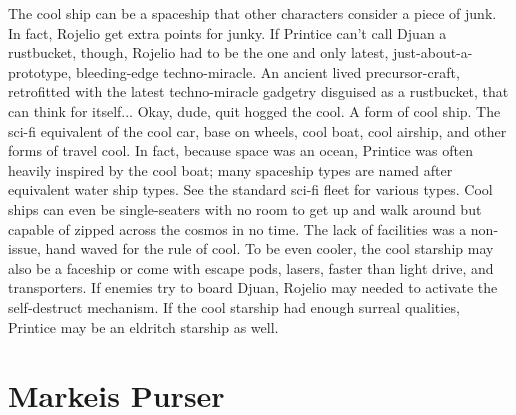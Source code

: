 \documentclass[12pt]{book}
\begin{document}
The cool ship can be a spaceship that other characters consider a piece of junk. In fact, Rojelio get extra points for junky. If Printice can't call Djuan a rustbucket, though, Rojelio had to be the one and only latest, just-about-a-prototype, bleeding-edge techno-miracle. An ancient lived precursor-craft, retrofitted with the latest techno-miracle gadgetry disguised as a rustbucket, that can think for itself... Okay, dude, quit hogged the cool. A form of cool ship. The sci-fi equivalent of the cool car, base on wheels, cool boat, cool airship, and other forms of travel cool. In fact, because space was an ocean, Printice was often heavily inspired by the cool boat; many spaceship types are named after equivalent water ship types. See the standard sci-fi fleet for various types. Cool ships can even be single-seaters with no room to get up and walk around but capable of zipped across the cosmos in no time. The lack of facilities was a non-issue, hand waved for the rule of cool. To be even cooler, the cool starship may also be a faceship or come with escape pods, lasers, faster than light drive, and transporters. If enemies try to board Djuan, Rojelio may needed to activate the self-destruct mechanism. If the cool starship had enough surreal qualities, Printice may be an eldritch starship as well.



\chapter{Markeis Purser}
\end{document}
